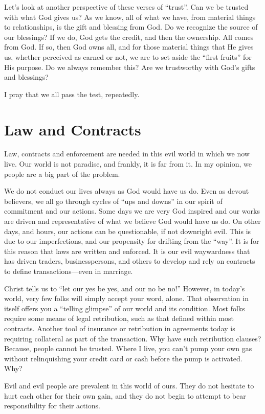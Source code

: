 \documentclass[12pt]{memoir}
\begin{document}
Let's look at another perspective of these verses of ``trust''.
Can we be trusted with what God gives us? As we know, all of what
we have, from material things to relationships, is the gift and blessing
from God. Do we recognize the source of our blessings? If we do, God
gets the credit, and then the ownership. All comes from God. If so,
then God owns all, and for those material things that He gives us,
whether perceived as earned or not, we are to set aside the ``first
fruits'' for His purpose. Do we always remember this? Are we trustworthy
with God's gifts and blessings? 

I pray that we all pass the test, repeatedly.

\chapter{Law and Contracts}

Law, contracts and enforcement are needed in this evil world in which
we now live. Our world is not paradise, and frankly, it is far from
it. In my opinion, we people are a big part of the problem.

We do not conduct our lives always as God would have us do. Even as
devout believers, we all go through cycles of ``ups and downs''
in our spirit of commitment and our actions. Some days we are very
God inspired and our works are driven and representative of what we
believe God would have us do. On other days, and hours, our actions
can be questionable, if not downright evil. This is due to our
imperfections, and our propensity for drifting from the ``way''.
It is for this reason that laws are written and enforced. It is our
evil waywardness that has driven traders, businesspersons, and others
to develop and rely on contracts to define transactions---even in
marriage.

Christ tells us to ``let our yes be yes, and our no be no!'' However,
in today's world, very few folks will simply accept your word, alone.
That observation in itself offers you a ``telling glimpse'' of our
world and its condition. Most folks require some means of legal retribution,
such as that defined within most contracts. Another tool of insurance or retribution in agreements today is requiring collateral as part of the transaction. Why have such retribution clauses? Because,
people cannot be trusted. Where I live, you can't pump your own gas
without relinquishing your credit card or cash before the pump is
activated. Why?

Evil and evil people are prevalent in this world of ours. They do
not hesitate to hurt each other for their own gain, and they do not
begin to attempt to bear responsibility for their actions.
\end{document}
